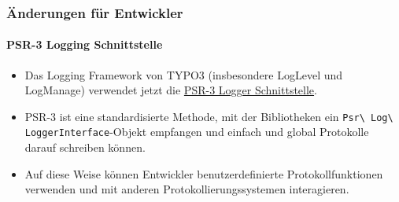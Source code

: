 \begin{frame}[fragile]
	\frametitle{Änderungen für Entwickler}
	\framesubtitle{PSR-3 Logging Schnittstelle}

	\begin{itemize}
		\item Das Logging Framework von TYPO3 (insbesondere LogLevel und LogManage) verwendet jetzt die 
			\href{https://www.php-fig.org/psr/psr-3/}{PSR-3 Logger Schnittstelle}.

		\item PSR-3 ist eine standardisierte Methode,  mit der Bibliotheken ein
			\texttt{Psr\textbackslash
				Log\textbackslash
				LoggerInterface}-Objekt empfangen und einfach und global Protokolle darauf schreiben können.

			\item Auf diese Weise können Entwickler benutzerdefinierte Protokollfunktionen 
				verwenden und mit anderen Protokollierungssystemen interagieren.

	\end{itemize}

\end{frame}


